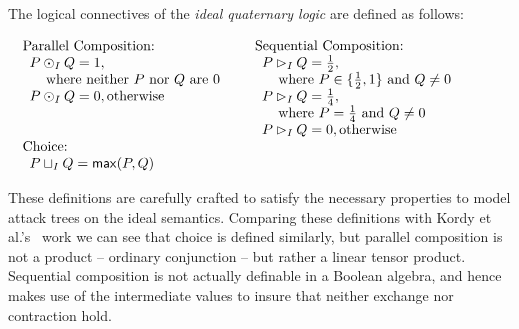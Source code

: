 \documentclass{llncs}
\begin{document}
\begin{definition}
  \label{def:ideal-semantics}
  The logical connectives of the \emph{ideal quaternary logic} are
  defined as follows:\vspace{-5px}
  \begin{center}
    \begin{math}
      \setlength{\arraycolsep}{5px}
      \begin{array}{lll}
        \begin{array}{lll}
          \text{Parallel Composition:}\\
          \begin{array}{lll}
            P \odot_I Q = 1,\\
            \,\,\,\,\,\,\,\text{where neither $P$ nor $Q$ are $0$}\\
            P \odot_I Q = 0, \text{otherwise}\\\\\\
          \end{array}
        \end{array}
        &
        \begin{array}{lll}
          \text{Sequential Composition:}\\
          \begin{array}{lll}          
            P \rhd_I Q = \half,\\
            \,\,\,\,\,\,\,\text{where } P \in \{\half, 1\} \text{ and } Q \neq 0\\            
            P \rhd_I Q = \forth,\\
            \,\,\,\,\,\,\,\text{where } P = \forth \text{ and } Q \neq 0\\
            P \rhd_I Q = 0, \text{otherwise}\\
          \end{array}
        \end{array}
        \\[30px]
        \begin{array}{lll}
          \text{Choice:}\\    
          \begin{array}{lll}
            P \sqcup_I Q = \mathsf{max}(P,Q)
          \end{array}
        \end{array}
      \end{array}
    \end{math}
  \end{center}        
\end{definition}
These definitions are carefully crafted to satisfy the necessary
properties to model attack trees on the ideal semantics.  Comparing
these definitions with Kordy et al.'s~\cite{Kordy:2012} work we can
see that choice is defined similarly, but parallel composition is not
a product -- ordinary conjunction -- but rather a linear tensor
product. Sequential composition is not actually definable in a Boolean
algebra, and hence makes use of the intermediate values to insure that
neither exchange nor contraction hold.
\end{document}
